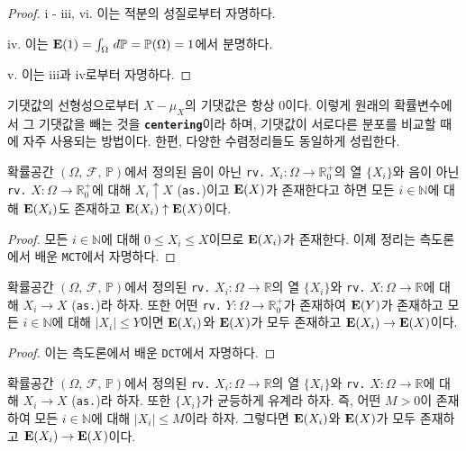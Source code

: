 \begin{proof}
    i - iii, vi. 이는 적분의 성질로부터 자명하다.

    iv. 이는 $\mathbf{E}(1)=\int_\Omega\,d\mathbb{P}=\mathbb{P}(\Omega)=1$에서 분명하다.

    v. 이는 iii과 iv로부터 자명하다.
\end{proof}

기댓값의 선형성으로부터 $X-\mu_X$의 기댓값은 항상 $0$이다. 이렇게 원래의 확률변수에서 그 기댓값을 빼는 것을 \textbf{\texttt{centering}}이라 하며, 기댓값이 서로다른 분포를 비교할 때에 자주 사용되는 방법이다. 한편, 다양한 수렴정리들도 동일하게 성립한다.

\begin{theorem}
    확률공간 $(\Omega,\,\mathcal{F},\,\mathbb{P})$에서 정의된 음이 아닌 \texttt{rv.} $X_i:\Omega\to\mathbb{R}^+_0$의 열 $\{X_i\}$와 음이 아닌 \texttt{rv.} $X:\Omega\to\mathbb{R}^+_0$에 대해 $X_i\uparrow X$ (\texttt{as.})이고 $\mathbf{E}(X)$가 존재한다고 하면 모든 $i\in\mathbb{N}$에 대해 $\mathbf{E}(X_i)$도 존재하고 $\mathbf{E}(X_i)\uparrow\mathbf{E}(X)$이다.
\end{theorem}

\begin{proof}
    모든 $i\in\mathbb{N}$에 대해 $0\leq X_i\leq X$이므로 $\mathbf{E}(X_i)$가 존재한다. 이제 정리는 측도론에서 배운 \texttt{MCT}에서 자명하다.
\end{proof}

\begin{theorem}
    확률공간 $(\Omega,\,\mathcal{F},\,\mathbb{P})$에서 정의된 \texttt{rv.} $X_i:\Omega\to\mathbb{R}$의 열 $\{X_i\}$와 \texttt{rv.} $X:\Omega\to\mathbb{R}$에 대해 $X_i\to X$ (\texttt{as.})라 하자. 또한 어떤 \texttt{rv.} $Y:\Omega\to\mathbb{R}^+_0$가 존재하여 $\mathbf{E}(Y)$가 존재하고 모든 $i\in\mathbb{N}$에 대해 $|X_i|\leq Y$이면 $\mathbf{E}(X_i)$와 $\mathbf{E}(X)$가 모두 존재하고 $\mathbf{E}(X_i)\to\mathbf{E}(X)$이다.
\end{theorem}

\begin{proof}
    이는 측도론에서 배운 \texttt{DCT}에서 자명하다.
\end{proof}

\begin{corollary}
    확률공간 $(\Omega,\,\mathcal{F},\,\mathbb{P})$에서 정의된 \texttt{rv.} $X_i:\Omega\to\mathbb{R}$의 열 $\{X_i\}$와 \texttt{rv.} $X:\Omega\to\mathbb{R}$에 대해 $X_i\to X$ (\texttt{as.})라 하자. 또한 $\{X_i\}$가 균등하게 유계라 하자. 즉, 어떤 $M>0$이 존재하여 모든 $i\in\mathbb{N}$에 대해 $|X_i|\leq M$이라 하자. 그렇다면 $\mathbf{E}(X_i)$와 $\mathbf{E}(X)$가 모두 존재하고 $\mathbf{E}(X_i)\to\mathbf{E}(X)$이다.
\end{corollary}

